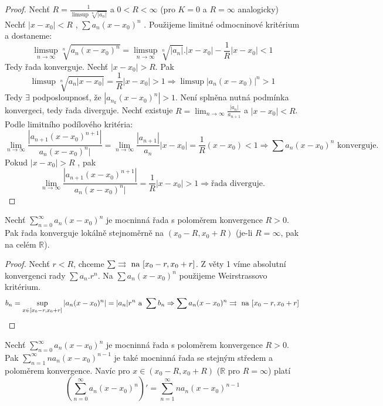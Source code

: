 \begin{proof}
Nechť $R = \frac{1}{\limsup \sqrt[n]{|a_n|}}$ a $0<R<\infty$ (pro $K = 0$ a $R = \infty$ analogicky)
Nechť $|x-x_0| < R$ , $\sum a_n(x-x_0)^n$ . Použijeme limitné odmocninové kritérium a dostaneme:
$$\limsup_{n \to \infty} \sqrt[n]{a_n(x-x_0)^n} = \limsup_{n \to \infty} \sqrt[n]{|a_n|} . |x-x_0| - \frac{1}{R} |x-x_0| < 1$$
Tedy řada konverguje.
Nechť $|x-x_0|>R$. Pak 
$$\limsup \sqrt[n]{a_n|x-x_0|} = \frac{1}{R}|x-x_0| > 1 \Rightarrow \limsup |a_n(x-x_0)|^n > 1$$
Tedy $\exists $ podposloupnosť, že $|a_{n_k} (x-x_0)^n| > 1$. Není splněna nutná podmínka konvergeci, tedy řada diverguje.
Nechť existuje $R = \lim_{n \to \infty } \frac{|a_n|}{a_{n+1}}$ a $|x-x_0|< R$. Podle limitního podílového kritéria:
$$\lim_{n \to \infty} \frac{|a_{n+1}(x-x_0)^{n+1}|}{a_n(x-x_0)^n|} = \lim_{n \to \infty} \frac{|a_{n+1}|}{a_n} |x-x_0| = \frac{1}{R} (x-x_0) < 1 \Rightarrow \sum a_n(x-x_0)^n \textrm{ konverguje.}$$
Pokud $|x-x_0| > R$ , pak 
$$\lim_{n \to \infty} \frac{|a_{n+1}(x-x_0)^{n+1}|}{a_n(x-x_0)^n|} = \frac{1}{R}|x-x_0|>1 \Rightarrow \textrm{řada diverguje.}$$
\end{proof}

\begin{vetal}
Nechť $\sum_{n=0}^{\infty} a_n (x-x_0)^n$ je mocninná řada s poloměrem konvergence $R > 0$.  Pak řada konverguje lokálně stejnoměrně na $(x_0 - R, x_0 + R)$ (je-li $R=\infty$, pak na celém $\mathbb{R}$).
\end{vetal}

\begin{proof}
Nechť $r < R$, chceme $\sum \rightrightarrows \textrm{ na } [x_0-r,x_0+r]$. Z věty 1 víme absolutní konvergenci rady $\sum a_n.r^n$. Na $ \sum a_n(x-x_0)^n$ použijeme Weirstrassovo kritérium.
$$b_n = \sup_{x \in[x_0-r, x_0+r]} |a_n(x-x_0)^n| = |a_n|r^n \textrm{ a } \sum b_n \Rightarrow \sum a_n(x-x_0)^n \rightrightarrows \textrm{ na } [x_0-r, x_0+r]$$
\end{proof}

\begin{vetal}
\label{o derivaci mocninné řady}
Nechť $\sum_{n=0}^{\infty} a_n (x-x_0)^n$ je mocninná řada s poloměrem konvergence $R > 0$. Pak $\sum_{n=1}^{\infty} n a_n (x-x_0)^{n-1}$ je také mocninná řada se stejným středem a poloměrem konvergence. Navíc pro $x \in ( x_0 - R, x_0 + R )$ ($\mathbb{R}$ pro $R = \infty$) platí
$$ \left( \sum_{n=0}^{\infty} a_n (x-x_0)^n \right)' = \sum_{n=1}^{\infty} n a_n (x-x_0)^{n-1}$$
\end{vetal}

